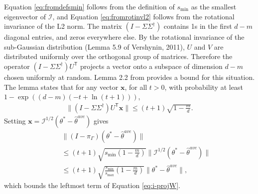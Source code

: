 \documentclass[twoside]{article}
\newcommand{\smin}{s_\text{min}}
\newcommand{\smax}{s_\text{max}}
\newcommand{\W}{{\hat \Theta^{\textit{owa}}}}
\newcommand{\E}{\mathbb{E}}
\newcommand{\x}{\mathbf{x}}
\newcommand{\w}{\theta}
\newcommand{\wave}{\hat\w^{ave}}
\newcommand{\wmle}{\hat\w^{mle}}
\newcommand{\wstar}{{\w^{*}}}
\newcommand{\I}{\mathcal I}
\newcommand{\trans}[1]{\ensuremath{{#1}^{\mathsf{T}}}}
\newcommand{\pinv}[1]{\ensuremath{{#1}^{\mathsf{\dagger}}}}
\newcommand{\ltwo}[1]{{\lVert {#1} \rVert}}
\newcommand{\proj}[1]{\pi_{{#1}}}
\begin{document}
Equation \ref{eq:fromdefsmin} follows from the definition of $\smin$ as the smallest eigenvector of $\I$,
and Equation \ref{eq:fromrotinvl2} follows from the rotational invariance of the L2 norm.
The matrix $(I-\Sigma\pinv\Sigma)$ contains 1s in the first $d-m$ diagonal entries, and zeros everywhere else.
By the rotational invariance of the sub-Gaussian distribution (Lemma 5.9 of Vershynin, 2011),
$U$ and $V$ are distributed uniformly over the orthogonal group of matrices.
Therefore the operator $(I-\Sigma\pinv\Sigma)\trans U$ projects a vector onto a subspace of dimension $d-m$ chosen uniformly at random.
Lemma 2.2 from \cite{dasgupta2003elementary} provides a bound for this situation.
The lemma states that for any vector $\x$, for all $t>0$, with probability at least $1-\exp((d-m)(-t+\ln (t+1)))$,
\begin{align}
\ltwo{(I-\Sigma\pinv\Sigma)\trans U \x} \le (t+1) \sqrt{1-\frac{m}{d}}
.
\label{eq:dasgupta}
\end{align}
Setting $\x=\I^{1/2}(\wstar-\wave)$ gives
\begin{align}
~~~~~&\!\!\!\!\!\!\!\!\!\!\!\ltwo{(I-\proj\Gamma)(\wstar-\wave)}
\nonumber
\\
&\le
(t+1)\sqrt{\smin\left(1-\frac{m}{d}\right)}\ltwo{\I^{1/2}(\wstar - \wave)}
\\
&\le
(t+1)\sqrt{\frac{\smin}{\smax}\left(1-\frac{m}{d}\right)}\ltwo{\wstar - \wave}
,
\end{align}
which bounds the leftmost term of Equation \ref{eq:i-projW}.

\end{document}
